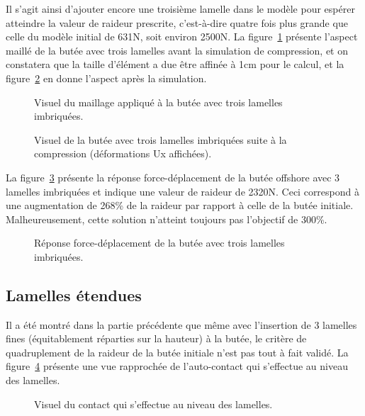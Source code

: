 ﻿\documentclass{article}
\begin{document}
Il s'agit ainsi d'ajouter encore une troisième lamelle dans le modèle pour espérer atteindre la valeur de raideur prescrite, c'est-à-dire quatre fois plus grande que celle du modèle initial de 631N, soit environ 2500N. La figure~\ref{fig13} présente l'aspect maillé de la butée avec trois lamelles avant la simulation de compression, et on constatera que la taille d'élément a due être affinée à 1cm pour le calcul, et la figure~\ref{fig14} en donne l'aspect après la simulation.

\begin{figure}[!h]
	\centering
	\caption{Visuel du maillage appliqué à la butée avec trois lamelles imbriquées.}
	\label{fig13}
\end{figure}

\begin{figure}[!h]
	\centering
	\caption{Visuel de la butée avec trois lamelles imbriquées suite à la compression (déformations Ux affichées).}
	\label{fig14}
\end{figure}

La figure~\ref{fig15} présente la réponse force-déplacement de la butée offshore avec 3 lamelles imbriquées et indique une valeur de raideur de 2320N. Ceci correspond à une augmentation de 268\% de la raideur par rapport à celle de la butée initiale. Malheureusement, cette solution n'atteint toujours pas l'objectif de 300\%.
 
\begin{figure}[!h]
	\centering
	\caption{Réponse force-déplacement de la butée avec trois lamelles imbriquées.}
	\label{fig15}
\end{figure}

\subsection{Lamelles étendues}
Il a été montré dans la partie précédente que même avec l'insertion de 3 lamelles fines (équitablement réparties sur la hauteur) à la butée, le critère de quadruplement de la raideur de la butée initiale n'est pas tout à fait validé. La figure~\ref{fig16} présente une vue rapprochée de l'auto-contact qui s'effectue au niveau des lamelles.

\begin{figure}[!h]
	\centering
	\caption{Visuel du contact qui s'effectue au niveau des lamelles.}
	\label{fig16}
\end{figure}
\end{document}
